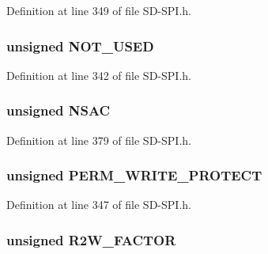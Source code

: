 Definition at line 349 of file S\+D-\/\+S\+P\+I.\+h.

\hypertarget{union_c_s_d_a75098a81c518e187eb7a43cc63ad1a9e}{}
\subsubsection[{N\+O\+T\+\_\+\+U\+S\+E\+D}]{\setlength{\rightskip}{0pt plus 5cm}unsigned N\+O\+T\+\_\+\+U\+S\+E\+D}\label{union_c_s_d_a75098a81c518e187eb7a43cc63ad1a9e}


Definition at line 342 of file S\+D-\/\+S\+P\+I.\+h.

\hypertarget{union_c_s_d_af4c16d2a19232aafe25a5fa6935cf1db}{}
\subsubsection[{N\+S\+A\+C}]{\setlength{\rightskip}{0pt plus 5cm}unsigned N\+S\+A\+C}\label{union_c_s_d_af4c16d2a19232aafe25a5fa6935cf1db}


Definition at line 379 of file S\+D-\/\+S\+P\+I.\+h.

\hypertarget{union_c_s_d_a3a2187b7b6f177b49edd72b3b7029a82}{}
\subsubsection[{P\+E\+R\+M\+\_\+\+W\+R\+I\+T\+E\+\_\+\+P\+R\+O\+T\+E\+C\+T}]{\setlength{\rightskip}{0pt plus 5cm}unsigned P\+E\+R\+M\+\_\+\+W\+R\+I\+T\+E\+\_\+\+P\+R\+O\+T\+E\+C\+T}\label{union_c_s_d_a3a2187b7b6f177b49edd72b3b7029a82}


Definition at line 347 of file S\+D-\/\+S\+P\+I.\+h.

\hypertarget{union_c_s_d_ae394f1cc9aa14ae785fa8e495d4e09e7}{}
\subsubsection[{R2\+W\+\_\+\+F\+A\+C\+T\+O\+R}]{\setlength{\rightskip}{0pt plus 5cm}unsigned R2\+W\+\_\+\+F\+A\+C\+T\+O\+R}\label{union_c_s_d_ae394f1cc9aa14ae785fa8e495d4e09e7}


